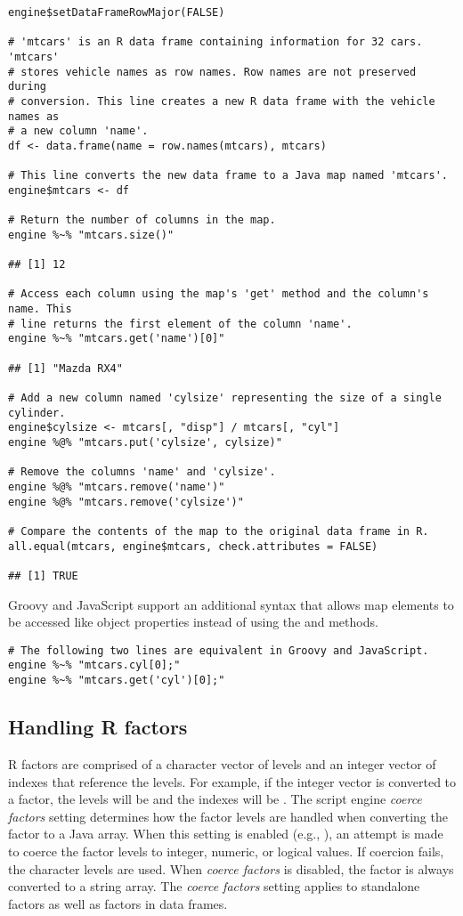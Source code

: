 \begin{verbatim}
engine$setDataFrameRowMajor(FALSE)

# 'mtcars' is an R data frame containing information for 32 cars. 'mtcars'
# stores vehicle names as row names. Row names are not preserved during
# conversion. This line creates a new R data frame with the vehicle names as
# a new column 'name'.
df <- data.frame(name = row.names(mtcars), mtcars)

# This line converts the new data frame to a Java map named 'mtcars'.
engine$mtcars <- df

# Return the number of columns in the map.
engine %~% "mtcars.size()"

## [1] 12

# Access each column using the map's 'get' method and the column's name. This
# line returns the first element of the column 'name'.
engine %~% "mtcars.get('name')[0]"

## [1] "Mazda RX4"

# Add a new column named 'cylsize' representing the size of a single cylinder.
engine$cylsize <- mtcars[, "disp"] / mtcars[, "cyl"]
engine %@% "mtcars.put('cylsize', cylsize)"

# Remove the columns 'name' and 'cylsize'.
engine %@% "mtcars.remove('name')"
engine %@% "mtcars.remove('cylsize')"

# Compare the contents of the map to the original data frame in R.
all.equal(mtcars, engine$mtcars, check.attributes = FALSE)

## [1] TRUE
\end{verbatim}

Groovy and JavaScript support an additional syntax that allows map elements to be accessed like object properties instead of using the  and  methods.

\begin{verbatim}
# The following two lines are equivalent in Groovy and JavaScript.
engine %~% "mtcars.cyl[0];"
engine %~% "mtcars.get('cyl')[0];"
\end{verbatim}

\subsection{Handling R factors}

R factors are comprised of a character vector of levels and an integer vector of indexes that reference the levels. For example, if the integer vector  is converted to a factor, the levels will be  and the indexes will be . The script engine \textit{coerce factors} setting determines how the factor levels are handled when converting the factor to a Java array. When this setting is enabled (e.g., ), an attempt is made to coerce the factor levels to integer, numeric, or logical values. If coercion fails, the character levels are used. When \textit{coerce factors} is disabled, the factor is always converted to a string array. The \textit{coerce factors} setting applies to standalone factors as well as factors in data frames.

